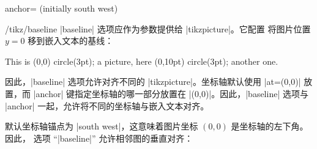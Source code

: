 \begin{pgfplotskey}{anchor= (initially south west)}
    \begin{key}{/tikz/baseline}
        |baseline| 选项应作为参数提供给 |tikzpicture|。它配置 \Tikz{} 将图片位置 $y=0$ 移到嵌入文本的基线：
\begin{codeexample}[width=3cm]
This is \tikz[baseline]\fill [red] (0,0) circle(3pt); a picture,
here \tikz[baseline]\fill [red] (0,10pt) circle(3pt); another one.
\end{codeexample}
        \noindent 因此，|baseline| 选项允许对齐不同的 |tikzpicture|。坐标轴默认使用 |at={(0,0)}| 放置，而 |anchor| 键指定坐标轴的哪一部分放置在 |(0,0)|。因此，|baseline| 选项与 |anchor| 一起，允许将不同的坐标轴与嵌入文本对齐。

        默认坐标轴锚点为 |south west|，这意味着图片坐标 $(0,0)$ 是坐标轴的左下角。因此，\Tikz{} 选项 ``|baseline|'' 允许相邻图的垂直对齐：
\begin{codeexample}[]
\pgfplotsset{domain=-1:1}
%
    \hspace{0.15cm}
\end{codeexample}

\begin{codeexample}[]
\pgfplotsset{domain=-1:1}
%
    \hspace{0.15cm}
\end{codeexample}


\end{key}
\end{pgfplotskey}
